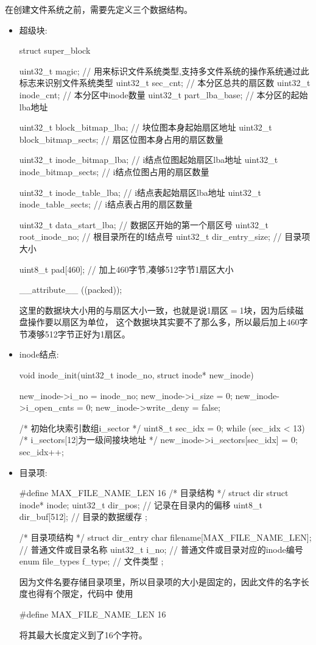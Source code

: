 在创建文件系统之前，需要先定义三个数据结构。
\begin{itemize}
\item 超级块:
\begin{ccode}
struct super_block {
   uint32_t magic;		    // 用来标识文件系统类型,支持多文件系统的操作系统通过此标志来识别文件系统类型
   uint32_t sec_cnt;		    // 本分区总共的扇区数
   uint32_t inode_cnt;		    // 本分区中inode数量
   uint32_t part_lba_base;	    // 本分区的起始lba地址

   uint32_t block_bitmap_lba;	    // 块位图本身起始扇区地址
   uint32_t block_bitmap_sects;     // 扇区位图本身占用的扇区数量

   uint32_t inode_bitmap_lba;	    // i结点位图起始扇区lba地址
   uint32_t inode_bitmap_sects;	    // i结点位图占用的扇区数量

   uint32_t inode_table_lba;	    // i结点表起始扇区lba地址
   uint32_t inode_table_sects;	    // i结点表占用的扇区数量

   uint32_t data_start_lba;	    // 数据区开始的第一个扇区号
   uint32_t root_inode_no;	    // 根目录所在的I结点号
   uint32_t dir_entry_size;	    // 目录项大小

   uint8_t  pad[460];		    // 加上460字节,凑够512字节1扇区大小
} __attribute__ ((packed));
\end{ccode}
这里的数据块大小用的与扇区大小一致，也就是说1扇区$=$1块，因为后续磁盘操作要以扇区为单位，
这个数据块其实要不了那么多，所以最后加上460字节凑够512字节正好为1扇区。
\item inode结点:
\begin{ccode}
void inode_init(uint32_t inode_no, struct inode* new_inode) {
   new_inode->i_no = inode_no;
   new_inode->i_size = 0;
   new_inode->i_open_cnts = 0;
   new_inode->write_deny = false;

   /* 初始化块索引数组i_sector */
   uint8_t sec_idx = 0;
   while (sec_idx < 13) {
   /* i_sectors[12]为一级间接块地址 */
      new_inode->i_sectors[sec_idx] = 0;
      sec_idx++;
   }
}
\end{ccode}
  
\item 目录项:
\begin{ccode}
#define MAX_FILE_NAME_LEN  16
/* 目录结构 */
struct dir {
   struct inode* inode;   
   uint32_t dir_pos;	  // 记录在目录内的偏移
   uint8_t dir_buf[512];  // 目录的数据缓存
};

/* 目录项结构 */
struct dir_entry {
   char filename[MAX_FILE_NAME_LEN];  // 普通文件或目录名称
   uint32_t i_no;		      // 普通文件或目录对应的inode编号
   enum file_types f_type;	      // 文件类型
};
\end{ccode}
因为文件名要存储目录项里，所以目录项的大小是固定的，因此文件的名字长度也得有个限定，代码中
使用
\begin{ccode}
#define MAX_FILE_NAME_LEN  16
\end{ccode}
将其最大长度定义到了16个字符。
\end{itemize}
